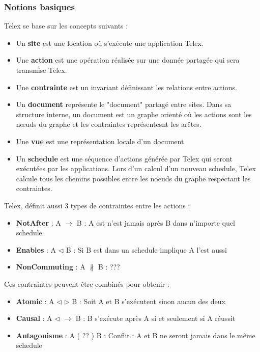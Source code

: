 \documentclass[a4paper,14pt]{article}
\begin{document}
\subsubsection{Notions basiques}
Telex se base sur les concepts suivants : 
\begin{itemize}
\item Un \textbf{site} est une location où s'exécute une application Telex.
\item Une \textbf{action} est une opération réalisée sur une donnée partagée qui sera transmise  Telex.
\item Une \textbf{contrainte} est un invariant définissant les relations entre actions. 
\item Un \textbf{document} représente le "document" partagé entre sites. Dans sa structure interne, un document est un graphe orienté où les actions sont les nœuds du graphe et les contraintes représentesnt les arêtes.
\item Une \textbf{vue} est une représentation locale d'un document
\item Un \textbf{schedule} est une séquence d'actions générée par Telex qui seront exécutées par les applications. Lors d'un calcul d'un nouveau schedule, Telex calcule tous les 
chemins possibles entre les noeuds du graphe respectant les contraintes.
\end{itemize}
Telex, définit aussi 3 types de contraintes entre les actions : 
\begin{itemize}
\item \textbf{NotAfter} : A $\rightarrow$ B : A est n'est jamais après B dans n'importe quel schedule
\item \textbf{Enables} : A $\triangleleft$ B : Si B est dans un schedule implique A l'est aussi
\item \textbf{NonCommuting} : A $\nparallel$ B : ???
\end{itemize}
Ces contraintes peuvent être combinés pour obtenir :
\begin{itemize}
\item \textbf{Atomic} : A $\triangleleft$ $\triangleright$  B : Soit A et B s'exécutent sinon aucun des deux
\item \textbf{Causal} : A $\triangleleft$ $\rightarrow$  B : B s'exécute après A si et seulement si A réussit 
\item \textbf{Antagonisme} : A ( ?? ) B : Conflit : A et B ne seront jamais dans le même schedule
\end{itemize}
\end{document}
